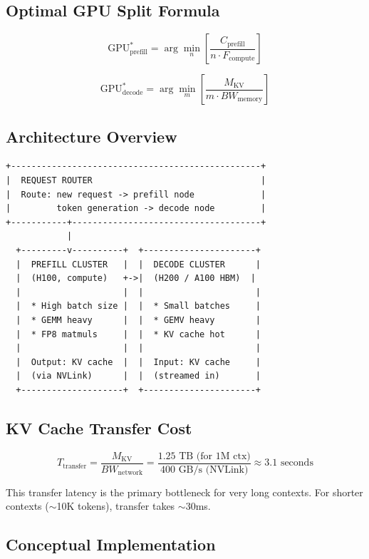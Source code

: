\documentclass[11pt,a4paper]{article}
\begin{document}
\subsection{Optimal GPU Split Formula}

$$\text{GPU}_{\text{prefill}}^* = \arg\min_n \left[\frac{C_{\text{prefill}}}{n \cdot F_{\text{compute}}}\right]$$

$$\text{GPU}_{\text{decode}}^* = \arg\min_m \left[\frac{M_{\text{KV}}}{m \cdot BW_{\text{memory}}}\right]$$

\subsection{Architecture Overview}

\begin{lstlisting}[basicstyle=\ttfamily\small, caption={Disaggregated Serving Architecture}]
+-------------------------------------------------+
|  REQUEST ROUTER                                 |
|  Route: new request -> prefill node             |
|         token generation -> decode node         |
+-----------+-------------------------------------+
            |
  +---------v----------+  +----------------------+
  |  PREFILL CLUSTER   |  |  DECODE CLUSTER      |
  |  (H100, compute)   +->|  (H200 / A100 HBM)  |
  |                    |  |                      |
  |  * High batch size |  |  * Small batches     |
  |  * GEMM heavy      |  |  * GEMV heavy        |
  |  * FP8 matmuls     |  |  * KV cache hot      |
  |                    |  |                      |
  |  Output: KV cache  |  |  Input: KV cache     |
  |  (via NVLink)      |  |  (streamed in)       |
  +--------------------+  +----------------------+
\end{lstlisting}

\subsection{KV Cache Transfer Cost}

$$T_{\text{transfer}} = \frac{M_{\text{KV}}}{BW_{\text{network}}} = \frac{1.25\text{ TB (for 1M ctx)}}{400\text{ GB/s (NVLink)}} \approx 3.1\text{ seconds}$$

This transfer latency is the primary bottleneck for very long contexts. For shorter contexts ($\sim$10K tokens), transfer takes $\sim$30ms.

\subsection{Conceptual Implementation}
\end{document}
